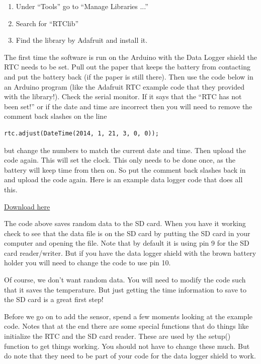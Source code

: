 	\begin{enumerate}
		\item Under ``Tools'' go to ``Manage Libraries ...''
		\item Search for ``RTClib''
		\item Find the library by Adafruit and install it.
	\end{enumerate}

    The first time the software is run on the Arduino with the Data Logger shield the RTC needs to be set.  Pull out the paper that keeps the battery from contacting  and put the battery back (if the paper is still there). Then use the code below in an Arduino program (like the Adafruit RTC example code that they provided with the library!). Check the serial monitor. If it says that the ``RTC has not been set!'' or if the date and time are incorrect then you will need to remove the comment back slashes on the line 
    
    \begin{lstlisting}[language=Arduino]
   		 rtc.adjust(DateTime(2014, 1, 21, 3, 0, 0));
    \end{lstlisting}
    
    \noindent but change the numbers to match the current date and time. Then upload the code again. This will set the clock. This only needs to be done once, as the battery will keep time from then on. So put the comment back slashes back in and upload the code again. Here is an example data logger code that does all this.

\href{https://raw.githubusercontent.com/rtlines/IntermediateLabPH250/main/Code/DataLog.ino}{Download here}
    


The code above saves random data to the SD card. When you have it working check to see that the data file is on the SD card by putting the SD card in your computer and opening the file.  Note that by default it is using pin 9 for the SD card reader/writer. But if you have the data logger shield with the brown battery holder you will need to change the code to use pin 10.

Of course, we don't want random data. You will need to modify the code such that it saves the temperature. But just getting the time information to save to the SD card is a great first step!

Before we go on to add the sensor, spend a few moments looking at the example code.  Notes that at the end there are some special functions that do things like initialize the RTC and the SD card reader.  These are used by the setup() function to get things working. You should not have to change these much.  But do note that they need to be part of your code for the data logger shield to work.

